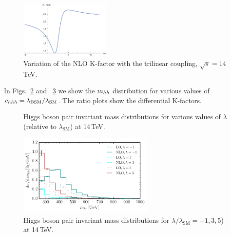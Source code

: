\begin{figure}[htb]
  \centering
    \includegraphics[width=0.4\textwidth]{section3/plots/Kfac_varlambda.pdf}
\caption{Variation of the NLO K-factor with the trilinear coupling, $\sqrt{s}=14$\,TeV.}
\label{fig:Kfacvariation}
\end{figure}



In Figs.~\ref{fig:lambda_small} and ~\ref{fig:lambda_large} we show the $m_{hh}$ distribution for various values of $c_{hhh}=\lambda_{\mathrm{BSM}}/\lambda_{\mathrm{SM}}$. 
The ratio plots show the differential K-factors. 

\begin{figure}[htb]
  \centering
 \caption{Higgs boson pair invariant mass distributions for various values of $\lambda$ (relative to $\lambda_{\mathrm{SM}}$)  at 14\,TeV.}
\label{fig:lambda_small}
\end{figure}
%
\begin{figure}[htb]
  \centering
    \includegraphics[width=0.6\textwidth]{section3/plots/mhh_Kfac_14TeV_varylambda_large.pdf}
\caption{Higgs boson pair invariant mass distributions for $\lambda/\lambda_{\mathrm{SM}}=-1,3,5$)  at 14\,TeV.}
\label{fig:lambda_large}
\end{figure}

